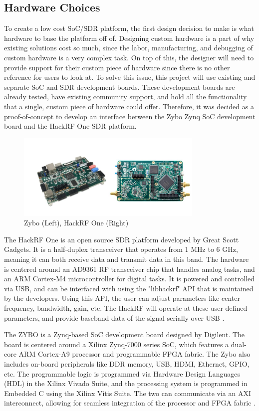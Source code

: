 \documentclass[conference]{IEEEtran}
\begin{document}
\subsection{Hardware Choices}
To create a low cost SoC/SDR platform, the first design decision to make is what hardware to base the platform off of. Designing custom hardware is a part of why existing solutions cost so much, since the labor, manufacturing, and debugging of custom hardware is a very complex task. On top of this, the designer will need to provide support for their custom piece of hardware since there is no other reference for users to look at. To solve this issue, this project will use existing and separate SoC and SDR development boards. These development boards are already tested, have existing community support, and hold all the functionality that a single, custom piece of hardware could offer. Therefore, it was decided as a proof-of-concept to develop an interface between the Zybo Zynq SoC
development board and the HackRF One SDR platform. 

\begin{figure}[htbp]
  \centering
  \includegraphics[width=3.5in]{images/zybohackrf.jpg} %
  \caption{Zybo (Left), HackRF One (Right)}
  \label{fig:zybohackrf}
\end{figure}

The HackRF One is an open source SDR platform developed by Great Scott Gadgets. It is a half-duplex transceiver that operates from 1 MHz to 6 GHz, meaning it can both receive data and transmit
data in this band. The hardware is centered around an AD9361 RF transceiver chip that handles analog tasks, and an ARM Cortex-M4 microcontroller for digital tasks. It is powered and controlled
via USB, and can be interfaced with using the "libhackrf" API that is maintained by the developers. Using this API, the user can adjust parameters like center frequency, bandwidth, gain, etc.
The HackRF will operate at these user defined parameters, and provide baseband data of the signal serially over USB \cite{hackrf_docs,hackrf_repo}.

The ZYBO is a Zynq-based SoC development board designed by Digilent. The board is centered around a Xilinx Zynq-7000 series SoC, which features a dual-core ARM Cortex-A9 processor and programmable FPGA fabric. The Zybo also includes on-board peripherals like DDR memory, USB, HDMI, Ethernet, GPIO, etc. The programmable logic is programmed via Hardware Design Languages (HDL) in the Xilinx Vivado Suite, and the processing system is programmed in Embedded C using the Xilinx Vitis Suite. The two can communicate via an AXI interconnect, allowing for seamless integration of the processor and FPGA fabric \cite{digilent_zybo_manual}.
\end{document}
